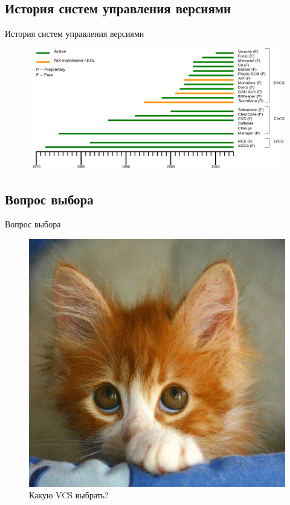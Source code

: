 \documentclass[presentation]{beamer}
\begin{document}


\subsection{История систем управления версиями}

\begin{frame}{История систем управления версиями}
  \begin{figure}[htb]
    \centering
    \includegraphics[width=1.05\textwidth]{vcs-timeline}
  \end{figure}
\end{frame}



\subsection{Вопрос выбора}

\begin{frame}{Вопрос выбора}
  \begin{figure}[htb]
    \centering
    \includegraphics[width=.7\textwidth]{scurred}
    \caption{\Large Какую VCS выбрать?}
  \end{figure}
\end{frame}
\end{document}
